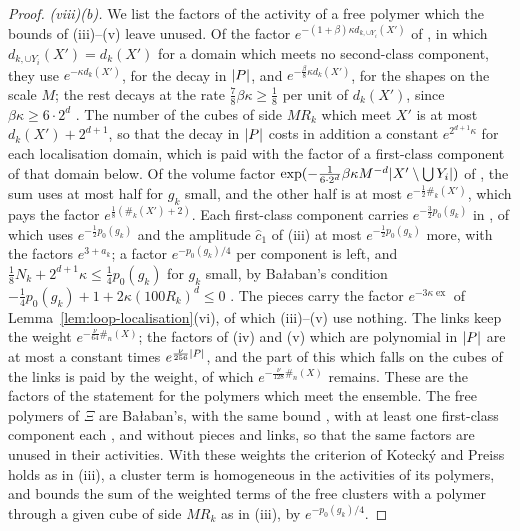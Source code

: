 \documentclass[11pt]{preprint}
\DeclarePairedDelimiter{\abs}{\lvert}{\rvert}
\numberwithin{equation}{section}
\theoremstyle{definition}
\theoremstyle{remark}
\theoremstyle{plain}
\begin{document}
\begin{proof}
\emph{(viii)(b).} We list the factors of the activity of a free polymer which the bounds of (iii)--(v) leave unused. Of the factor $e^{-(1+\beta)\kappa d_{k,\cup Y_i}(X')}$ of \cite[(1.95)]{BalabanLFR2}, in which $d_{k,\cup Y_i}(X') = d_k(X')$ for a domain which meets no second-class component, they use $e^{-\kappa d_k(X')}$, for the decay in $\abs P$, and $e^{-\frac\beta8\kappa d_k(X')}$, for the shapes on the scale $M$; the rest decays at the rate $\frac78\beta\kappa \geq \frac18$ per unit of $d_k(X')$, since $\beta\kappa \geq 6 \cdot 2^d$ \cite[p.~389]{BalabanLFR2}. The number of the cubes of side $MR_k$ which meet $X'$ is at most $d_k(X') + 2^{d+1}$, so that the decay in $\abs P$ costs in addition a constant $e^{2^{d+1}\kappa}$ for each localisation domain, which is paid with the factor of a first-class component of that domain below. Of the volume factor $\exp(-\frac{1}{6 \cdot 2^d}\beta\kappa M^{-d}\abs{X' \setminus \bigcup Y_i})$ of \cite[(1.95)]{BalabanLFR2}, the sum \cite[(1.96)]{BalabanLFR2} uses at most half for $g_k$ small, and the other half is at most $e^{-\frac12\#_k(X')}$, which pays the factor $e^{\frac18(\#_k(X') + 2)}$. Each first-class component carries $e^{-\frac32p_0(g_k)}$ in \cite[(1.95)]{BalabanLFR2}, of which \cite[(1.96)]{BalabanLFR2} uses $e^{-\frac12p_0(g_k)}$ and the amplitude $\hat c_1$ of (iii) at most $e^{-\frac12p_0(g_k)}$ more, with the factors $e^{3 + a_k}$; a factor $e^{-p_0(g_k)/4}$ per component is left, and $\frac18N_k + 2^{d+1}\kappa \leq \frac14p_0(g_k)$ for $g_k$ small, by Ba{\l}aban's condition $-\frac14p_0(g_k) + 1 + 2\kappa(100R_k)^d \leq 0$ \cite[p.~389]{BalabanLFR2}. The pieces carry the factor $e^{-3\kappa\operatorname{ex}}$ of Lemma~\ref{lem:loop-localisation}(vi), of which (iii)--(v) use nothing. The links keep the weight $e^{-\frac{\nu}{64}\#_n(X)}$; the factors of (iv) and (v) which are polynomial in $\abs P$ are at most a constant times $e^{\frac{\nu}{256}\abs P}$, and the part of this which falls on the cubes of the links is paid by the weight, of which $e^{-\frac{\nu}{128}\#_n(X)}$ remains. These are the factors of the statement for the polymers which meet the ensemble. The free polymers of $\Xi$ are Ba{\l}aban's, with the same bound \cite[(1.95)]{BalabanLFR2}, with at least one first-class component each \cite[p.~389]{BalabanLFR2}, and without pieces and links, so that the same factors are unused in their activities. With these weights the criterion of Koteck\'y and Preiss holds as in (iii), a cluster term is homogeneous in the activities of its polymers, and \cite[Theorem~5.4]{FriedliVelenik} bounds the sum of the weighted terms of the free clusters with a polymer through a given cube of side $MR_k$ as in (iii), by $e^{-p_0(g_k)/4}$.


\end{proof}
\end{document}
